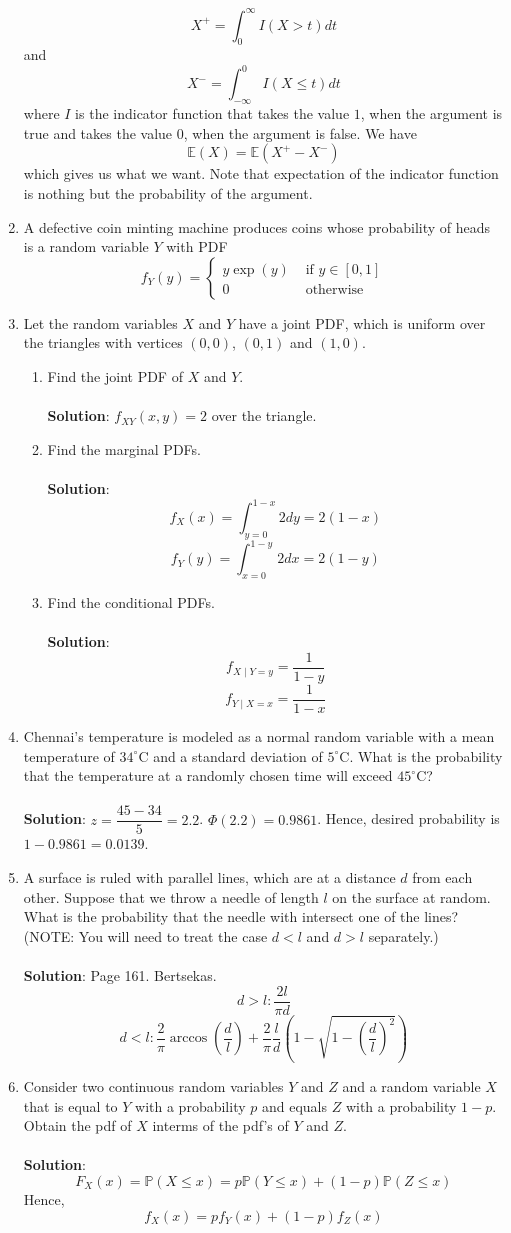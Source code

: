 \documentclass{article}
\newcommand{\dint}{\displaystyle\int}
\newcommand{\Pb}{\mathbb{P}}
\newcommand{\Eb}{\mathbb{E}}
\newcommand{\soln}[1]{\\ \textbf{Solution}: #1}
\newcommand{\bkt}[1]{\left(#1\right)}
\begin{document}
\begin{enumerate}
{		$$X^+ = \dint_0^{\infty} I\bkt{X > t}dt$$
		and
		$$X^- = \dint_{-\infty}^0 I\bkt{X \leq t}dt$$
		where $I$ is the indicator function that takes the value $1$, when the argument is true and takes the value $0$, when the argument is false. We have
		$$\Eb\bkt{X} = \Eb\bkt{X^+-X^-}$$
		which gives us what we want. Note that expectation of the indicator function is nothing but the probability of the argument.
		}
		\item
		A defective coin minting machine produces coins whose probability of heads is a random variable $Y$ with PDF
		$$f_Y\bkt{y} = \begin{cases}
		y \exp\bkt{y} & \text{ if }y \in [0,1]\\
		0 & \text{ otherwise}
		\end{cases}$$
		\item
		Let the random variables $X$ and $Y$ have a joint PDF, which is uniform over the triangles with vertices $(0,0)$, $(0,1)$ and $(1,0)$.
		\begin{enumerate}
			\item
			Find the joint PDF of $X$ and $Y$.\\
			\soln{
			$f_{XY}(x,y) = 2$ over the triangle.
			}
			\item
			Find the marginal PDFs.\\
			\soln{
			$$f_X(x) = \dint_{y=0}^{1-x} 2dy = 2\bkt{1-x}$$
			$$f_Y(y) = \dint_{x=0}^{1-y} 2dx = 2\bkt{1-y}$$			
			}
			\item
			Find the conditional PDFs.\\
			\soln{
			$$f_{X \mid Y=y} = \dfrac1{1-y}$$
			$$f_{Y \mid X=x} = \dfrac1{1-x}$$
			}
		\end{enumerate}
		\item
		Chennai's temperature is modeled as a normal random variable with a mean temperature of $34^{\circ}$C and a standard deviation of $5^{\circ}$C. What is the probability that the temperature at a randomly chosen time will exceed $45^{\circ}$C?\\
		\soln{
		$z = \dfrac{45-34}5 = 2.2$. $\Phi\bkt{2.2} = 0.9861$. Hence, desired probability is $1-0.9861 = 0.0139$.
		}
		\item
		A surface is ruled with parallel lines, which are at a distance $d$ from each other. Suppose that we throw a needle of length $l$ on the surface at random. What is the probability that the needle with intersect one of the lines? (NOTE: You will need to treat the case $d<l$ and $d>l$ separately.)\\
		\soln{
		Page 161. Bertsekas.
		$$d > l: \dfrac{2l}{\pi d}$$
		$$d < l: \dfrac2{\pi} \arccos\bkt{\dfrac{d}l} + \dfrac2{\pi} \dfrac{l}d \bkt{1-\sqrt{1-\bkt{\dfrac{d}l}^2}}$$
		}
		\item
		Consider two continuous random variables $Y$ and $Z$ and a random variable $X$ that is equal to $Y$ with a probability $p$ and equals $Z$ with a probability $1-p$. Obtain the pdf of $X$ interms of the pdf's of $Y$ and $Z$.\\
		\soln{
		$$F_X(x) = \Pb\bkt{X \leq x} = p \Pb\bkt{Y \leq x} + \bkt{1-p} \Pb\bkt{Z \leq x}$$
		Hence,
		$$f_X(x) = p f_Y(x) + \bkt{1-p} f_Z(x)$$
		}
	\end{enumerate}
\end{document}

